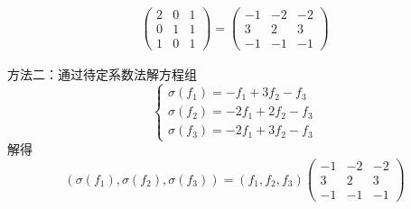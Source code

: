 \documentclass[UTF8,12pt,a4paper,fontset=fandol]{ctexart}
\begin{document}
\begin{solve}
\begin{enumerate}
\begin{align*}
                          \begin{pmatrix}
                              2 & 0 & 1 \\
                              0 & 1 & 1 \\
                              1 & 0 & 1
                          \end{pmatrix}
                          = \begin{pmatrix}
                                -1 & -2 & -2 \\
                                3  & 2  & 3  \\
                                -1 & -1 & -1
                            \end{pmatrix}
                      \end{align*}

                      方法二：通过待定系数法解方程组
                      \[ \begin{cases}
                              \sigma(f_1) = -f_1 + 3 f_2 - f_3   \\
                              \sigma(f_2) = -2 f_1 + 2 f_2 - f_3 \\
                              \sigma(f_3) = -2 f_1 + 3 f_2 - f_3
                          \end{cases} \]
                      解得
                      \[ (\sigma(f_1), \sigma(f_2), \sigma(f_3)) = (f_1, f_2, f_3) \begin{pmatrix}
                              -1 & -2 & -2 \\
                              3  & 2  & 3  \\
                              -1 & -1 & -1
                          \end{pmatrix} \]


\end{enumerate}
\end{solve}
\end{document}

